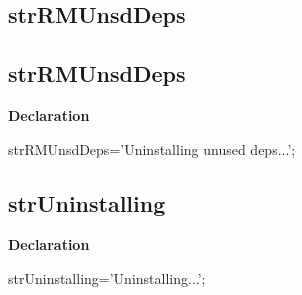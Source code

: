 \documentclass{report}
\newif\ifpdf
\begin{document}
\subsection*{\large{\textbf{strRMUnsdDeps}}\normalsize\hspace{1ex}\hrulefill}
\else
\subsection*{strRMUnsdDeps}
\fi
\label{trstrings-strRMUnsdDeps}
\begin{list}{}{
\setlength{\itemindent}{0cm}
\setlength{\listparindent}{0cm}
\setlength{\leftmargin}{\evensidemargin}
\addtolength{\leftmargin}{\tmplength}
\settowidth{\labelsep}{X}
\addtolength{\leftmargin}{\labelsep}
\setlength{\labelwidth}{\tmplength}
}
\item[\textbf{Declaration}\hfill]
\ifpdf
\begin{flushleft}
\fi
\begin{ttfamily}
strRMUnsdDeps='Uninstalling unused deps...';\end{ttfamily}

\ifpdf
\end{flushleft}
\fi

\end{list}
\ifpdf
\subsection*{\large{\textbf{strUninstalling}}\normalsize\hspace{1ex}\hrulefill}
\else
\subsection*{strUninstalling}
\fi
\label{trstrings-strUninstalling}
\begin{list}{}{
\setlength{\itemindent}{0cm}
\setlength{\listparindent}{0cm}
\setlength{\leftmargin}{\evensidemargin}
\addtolength{\leftmargin}{\tmplength}
\settowidth{\labelsep}{X}
\addtolength{\leftmargin}{\labelsep}
\setlength{\labelwidth}{\tmplength}
}
\item[\textbf{Declaration}\hfill]
\ifpdf
\begin{flushleft}
\fi
\begin{ttfamily}
strUninstalling='Uninstalling...';\end{ttfamily}

\ifpdf
\end{flushleft}
\fi

\end{list}
\ifpdf
\end{document}
